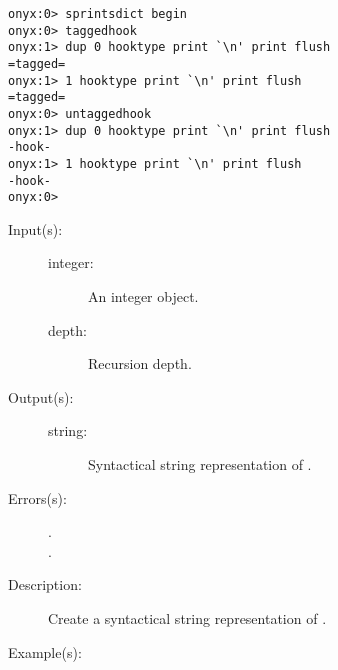 \begin{description}
\begin{description}
\begin{verbatim}
onyx:0> sprintsdict begin
onyx:0> taggedhook
onyx:1> dup 0 hooktype print `\n' print flush
=tagged=
onyx:1> 1 hooktype print `\n' print flush
=tagged=
onyx:0> untaggedhook
onyx:1> dup 0 hooktype print `\n' print flush
-hook-
onyx:1> 1 hooktype print `\n' print flush
-hook-
onyx:0>
		\end{verbatim}
	\end{description}
\label{sprintsdict:integertype}
\item[{\onyxop{integer depth}{integertype}{string}}: ]
	\begin{description}\item[]
	\item[Input(s): ]
		\begin{description}\item[]
		\item[integer: ]
			An integer object.
		\item[depth: ]
			Recursion depth.
		\end{description}
	\item[Output(s): ]
		\begin{description}\item[]
		\item[string: ]
			Syntactical string representation of .
		\end{description}
	\item[Errors(s): ]
		\begin{description}\item[]
		\item[.]
		\item[.]
		\end{description}
	\item[Description: ]
		Create a syntactical string representation of .
	\item[Example(s): ]\begin{verbatim}


\end{verbatim}
\end{description}
\end{description}
